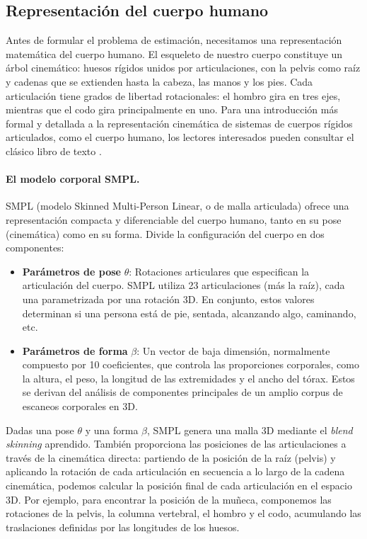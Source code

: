 \documentclass[../../book-main_es.tex]{subfiles}
\begin{document}
\subsection{Representación del cuerpo humano}
\label{sub:egoallo_body_models}

Antes de formular el problema de estimación, necesitamos una
representación matemática del cuerpo humano. El esqueleto de nuestro cuerpo constituye un
árbol cinemático: huesos rígidos unidos por articulaciones, con la pelvis como
raíz y cadenas que se extienden hasta la cabeza, las manos y los pies. Cada articulación
tiene grados de libertad rotacionales: el hombro gira en tres
ejes, mientras que el codo gira principalmente en uno. Para una introducción más formal y detallada
a la representación cinemática de sistemas de cuerpos rígidos articulados, como
el cuerpo humano, los lectores interesados pueden consultar el clásico libro de texto
\cite{MurrayR1994}.

\paragraph{El modelo corporal SMPL.}
SMPL (modelo Skinned Multi-Person Linear, o de malla articulada)\citep{loper2015smpl}
ofrece una representación compacta y diferenciable del cuerpo humano,
tanto en su pose (cinemática) como en su forma. Divide 
la configuración del cuerpo en dos componentes:
\begin{itemize}
    \item \textbf{Parámetros de pose} $\theta$: Rotaciones articulares
        que especifican la articulación del cuerpo. SMPL utiliza 23 articulaciones (más
        la raíz), cada una parametrizada por una rotación 3D. En conjunto,
        estos valores determinan si una persona está de pie, sentada,
        alcanzando algo, caminando, etc.
    \item \textbf{Parámetros de forma} $\beta$: Un vector de baja dimensión,
        normalmente compuesto por 10 coeficientes, que controla las proporciones
        corporales, como la altura, el peso, la longitud de las extremidades y el ancho
        del tórax. Estos se derivan del análisis de componentes principales de
        un amplio corpus de escaneos corporales en 3D.
\end{itemize}

Dadas una pose $\theta$ y una forma $\beta$, SMPL genera una malla 3D mediante
el \textit{blend skinning} aprendido. También proporciona las posiciones de las articulaciones a través de
la cinemática directa: partiendo de la posición de la raíz (pelvis) y
aplicando la rotación de cada articulación en secuencia a lo largo de la cadena cinemática,
podemos calcular la posición final de cada articulación en el espacio 3D. Por ejemplo, para
encontrar la posición de la muñeca, componemos las rotaciones de la pelvis,
la columna vertebral, el hombro y el codo, acumulando las traslaciones definidas por
las longitudes de los huesos.
\end{document}
